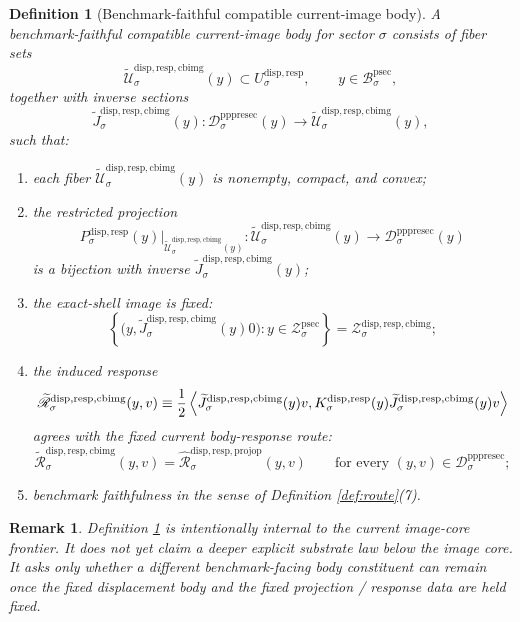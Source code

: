 \documentclass[11pt]{article}
\newcommand{\ProtoSectionBody}[1]{\mathcal B_{#1}^{\mathrm{psec}}}
\newcommand{\ProtoSectionShell}[1]{\mathcal Z_{#1}^{\mathrm{psec}}}
\newcommand{\PrePreProtoSectionResidualBody}[1]{\mathcal D_{#1}^{\mathrm{pppresec}}}
\newcommand{\SubstrateCarrier}[1]{U_{#1}^{\mathrm{disp,resp}}}
\newcommand{\SubstrateProjection}[1]{P_{#1}^{\mathrm{disp,resp}}}
\newcommand{\SubstrateOperator}[1]{K_{#1}^{\mathrm{disp,resp}}}
\newcommand{\CoreForcedBodyResponse}[1]{\widehat{\mathscr R}_{#1}^{\mathrm{disp,resp,projop}}}
\newcommand{\CanonicalImageShell}[1]{\mathcal Z_{#1}^{\mathrm{disp,resp,cbimg}}}
\newcommand{\CompatibleImageBody}[1]{\widetilde{\mathcal U}_{#1}^{\mathrm{disp,resp,cbimg}}}
\newcommand{\CompatibleImageLift}[1]{\widetilde J_{#1}^{\mathrm{disp,resp,cbimg}}}
\newcommand{\CompatibleImageResponse}[1]{\widetilde{\mathscr R}_{#1}^{\mathrm{disp,resp,cbimg}}}
\newtheorem{definition}{Definition}
\newtheorem{remark}{Remark}
\begin{document}
\begin{definition}[Benchmark-faithful compatible current-image body]
\label{def:compatible}
A \emph{benchmark-faithful compatible current-image body} for sector \(\sigma\) consists of fiber sets
\[
\CompatibleImageBody{\sigma}(y)\subset\SubstrateCarrier{\sigma},
\qquad
y\in\ProtoSectionBody{\sigma},
\]
together with inverse sections
\[
\CompatibleImageLift{\sigma}(y):
\PrePreProtoSectionResidualBody{\sigma}(y)\to\CompatibleImageBody{\sigma}(y),
\]
such that:
\begin{enumerate}
    \item each fiber \(\CompatibleImageBody{\sigma}(y)\) is nonempty, compact, and convex;
    \item the restricted projection
    \[
    \SubstrateProjection{\sigma}(y)\big|_{\CompatibleImageBody{\sigma}(y)}
    :
    \CompatibleImageBody{\sigma}(y)\to\PrePreProtoSectionResidualBody{\sigma}(y)
    \]
    is a bijection with inverse \(\CompatibleImageLift{\sigma}(y)\);
    \item the exact-shell image is fixed:
    \[
    \left\{
    \bigl(y,\CompatibleImageLift{\sigma}(y)0\bigr):
    y\in\ProtoSectionShell{\sigma}
    \right\}
    =
    \CanonicalImageShell{\sigma};
    \]
    \item the induced response
    \begin{equation}
    \CompatibleImageResponse{\sigma}(y,v)
    \equiv
    \frac{1}{2}
    \ev{
    \CompatibleImageLift{\sigma}(y)v,
    \SubstrateOperator{\sigma}(y)\CompatibleImageLift{\sigma}(y)v
    }
    \label{eq:compatresponse}
    \end{equation}
    agrees with the fixed current body-response route:
    \[
    \CompatibleImageResponse{\sigma}(y,v)
    =
    \CoreForcedBodyResponse{\sigma}(y,v)
    \qquad
    \text{for every }
    (y,v)\in\PrePreProtoSectionResidualBody{\sigma};
    \]
    \item benchmark faithfulness in the sense of Definition \ref{def:route}(7).
\end{enumerate}
\end{definition}

\begin{remark}
Definition \ref{def:compatible} is intentionally internal to the current image-core frontier. It does not yet claim a deeper explicit substrate law below the image core. It asks only whether a different benchmark-facing body constituent can remain once the fixed displacement body and the fixed projection / response data are held fixed.
\end{remark}
\end{document}
